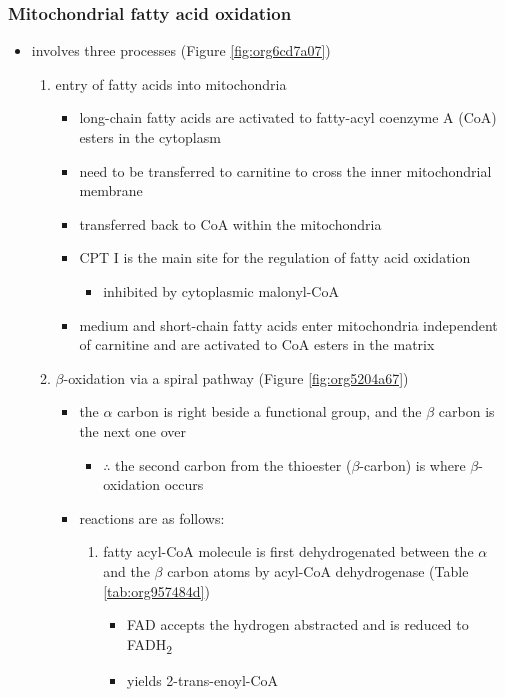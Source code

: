 \documentclass[12pt]{scrartcl}
\begin{document}
\subsubsection{Mitochondrial fatty acid oxidation}
\label{sec:org7b69611}
\begin{itemize}
\item involves three processes (Figure \ref{fig:org6cd7a07})
\begin{enumerate}
\item entry of fatty acids into mitochondria
\begin{itemize}
\item long-chain fatty acids are activated to fatty-acyl coenzyme A (CoA) esters
in the cytoplasm
\item need to be transferred to carnitine to cross the inner
mitochondrial membrane
\item transferred back to CoA within the mitochondria
\item CPT I is the main site for the regulation of fatty acid
oxidation
\begin{itemize}
\item inhibited by cytoplasmic malonyl-CoA
\end{itemize}
\item medium and short-chain fatty acids enter mitochondria
independent of carnitine and are activated to CoA esters in the
matrix
\end{itemize}
\item \(\beta\)-oxidation via a spiral pathway (Figure \ref{fig:org5204a67})
\begin{itemize}
\item the \(\alpha\) carbon is right beside a functional group, and the
\(\beta\) carbon is the next one over
\begin{itemize}
\item \(\therefore\) the second carbon from the thioester (\(\beta\)-carbon) is where
\(\beta\)-oxidation occurs
\end{itemize}
\item reactions are as follows:
\begin{enumerate}
\item fatty acyl-CoA molecule is first dehydrogenated between the \(\alpha\)
and the \(\beta\) carbon atoms by acyl-CoA dehydrogenase (Table \ref{tab:org957484d})
\begin{itemize}
\item FAD accepts the hydrogen abstracted and is reduced to FADH\textsubscript{2}
\item yields 2-trans-enoyl-CoA

\end{itemize}
\end{enumerate}
\end{itemize}
\end{enumerate}
\end{itemize}
\end{document}

